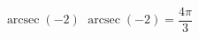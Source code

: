  {$\operatorname{arcsec} \left( -2 \right)$ }
{ $\operatorname{arcsec} \left( -2 \right) = \dfrac{4\pi}{3}$}
